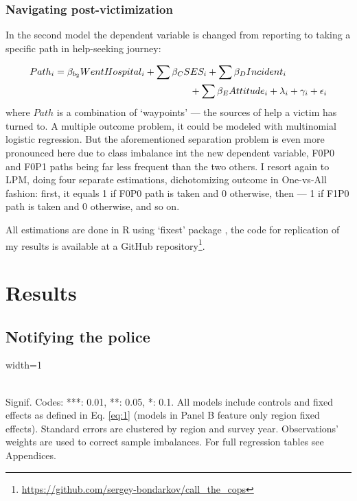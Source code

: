 \documentclass[]{interact}
\theoremstyle{plain}%
\theoremstyle{definition}
\theoremstyle{remark}
\newcommand\citep{\parencite}
\begin{document}
	\subsubsection*{Navigating post-victimization}
	
	In the second model the dependent variable is changed from reporting to taking a specific path in help-seeking journey:
	
	\begin{equation}
	\begin{multlined}[.9\linewidth]
		\label{eq:2}
		Path_i = \beta_{b_2} WentHospital_i + \sum \beta_C SES_i +
		\sum \beta_D Incident_i \\ + \sum \beta_E Attitude_i + \lambda_i + \gamma_i + \epsilon_i
	\end{multlined}
	\end{equation}
	where $Path$ is a combination of `waypoints' --- the sources of help a victim has turned to. A multiple outcome problem, it could be modeled with multinomial logistic regression. But the aforementioned separation problem is even more pronounced here due to class imbalance int the new dependent variable, F0P0 and F0P1 paths being far less frequent than the two others. I resort again to LPM, doing four separate estimations, dichotomizing outcome in One-vs-All fashion: first, it equals 1 if F0P0 path is taken and 0 otherwise, then --- 1 if F1P0 path is taken and 0 otherwise, and so on.
	
	All estimations are done in R using `fixest' package \citep{berge2026fixest}, the code for replication of my results is available at a GitHub repository\footnote{\url{https://github.com/sergey-bondarkov/call_the_cops}}.

	\section*{Results}
	\label{sec:results}
	
	\subsection*{Notifying the police}
	
\begin{table}
	\caption{Effect of informing friends or family on the probability of reporting to the police (LPM)}
	\label{table:regr_1}
	\begin{adjustbox}{width=1\textwidth}
		
	\end{adjustbox}
	\\
	\footnotesize Signif. Codes: ***: 0.01, **: 0.05, *: 0.1. All models include controls and fixed effects as defined in Eq. \ref{eq:1} (models in Panel B feature only region fixed effects). Standard errors are clustered by region and survey year. Observations' weights are used to correct sample imbalances. For full regression tables see Appendices. 
\end{table}
\end{document}

